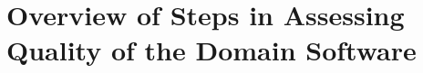 \documentclass[letterpaper,cleveref]{lipics-v2019}
\theoremstyle{definition}
\begin{document}
%
%
%
%
%

\section{Overview of Steps in Assessing Quality of the Domain Software}\label{StepsAQDS}
\end{document}
